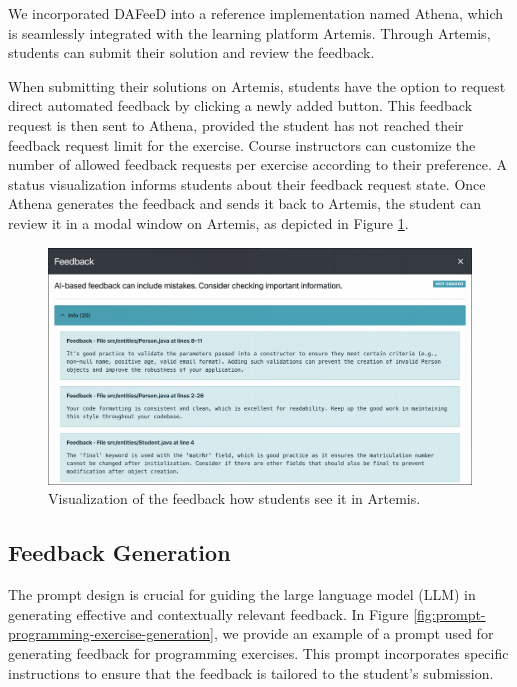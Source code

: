 \documentclass[manuscript,screen,review]{acmart}
\begin{document}
We incorporated DAFeeD into a reference implementation named Athena, which is seamlessly integrated with the learning platform Artemis. 
Through Artemis, students can submit their solution and review the feedback.

When submitting their solutions on Artemis, students have the option to request direct automated feedback by clicking a newly added button.
This feedback request is then sent to Athena, provided the student has not reached their feedback request limit for the exercise.
Course instructors can customize the number of allowed feedback requests per exercise according to their preference.
A status visualization informs students about their feedback request state.
Once Athena generates the feedback and sends it back to Artemis, the student can review it in a modal window on Artemis, as depicted in Figure \ref{fig:Artemis-feedback-visualization}.

\begin{figure}[htbp]
  \centering
  \includegraphics[width=0.75\linewidth]{figures/artemis-feedback-alt_light_clarity-upscaler_anonymized.png}
  \caption{Visualization of the feedback how students see it in Artemis.}
  \label{fig:Artemis-feedback-visualization}
\end{figure}


\subsection{Feedback Generation}

The prompt design is crucial for guiding the large language model (LLM) in generating effective and contextually relevant feedback. 
In Figure \ref{fig:prompt-programming-exercise-generation}, we provide an example of a prompt used for generating feedback for programming exercises. 
This prompt incorporates specific instructions to ensure that the feedback is tailored to the student's submission.
\end{document}

